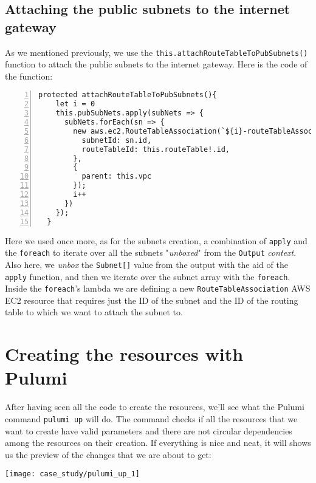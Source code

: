 \subsection{Attaching the public subnets to the internet gateway}
As we mentioned previously, we use the \texttt{this.attachRouteTableToPubSubnets()} function to attach the public subnets to the internet gateway.
Here is the code of the function:\\
\begin{minipage}{\linewidth}
\begin{lstlisting}[numbers=left, numberstyle=\tiny, numbersep=-5pt, stepnumber=1]
  protected attachRouteTableToPubSubnets(){
    let i = 0
    this.pubSubNets.apply(subNets => {
      subNets.forEach(sn => {
        new aws.ec2.RouteTableAssociation(`${i}-routeTableAssociation-typescript`, {
          subnetId: sn.id,
          routeTableId: this.routeTable!.id,
        },
        {
          parent: this.vpc
        });
        i++
      })
    });
  }
\end{lstlisting}
\end{minipage}
Here we used once more, as for the subnets creation, a combination of \texttt{apply} and the \texttt{foreach} to iterate over all the subnets "\textit{unboxed}" from the \texttt{Output} \textit{context}.
Also here, we \textit{unbox} the \texttt{Subnet[]} value from the output with the aid of the \texttt{apply} function, and then we iterate over the subnet array with the \texttt{foreach}.\\
Inside the \texttt{foreach}'s lambda we are defining a new \texttt{RouteTableAssociation} AWS EC2 resource that requires just the ID of the subnet and the ID of the routing table to which we want to attach the subnet to.

\section{Creating the resources with Pulumi}
\label{sec:ts-res-creation}
After having seen all the code to create the resources, we'll see what the Pulumi command \texttt{pulumi up} will do.
The command checks if all the resources that we want to create have valid parameters and there are not circular dependencies among the resources on their creation.
If everything is nice and neat, it will shows us the preview of the changes that we are about to get:
\begin{center}
  \texttt{[image: case\_study/pulumi\_up\_1]} 
\end{center}\mbox{}\\

